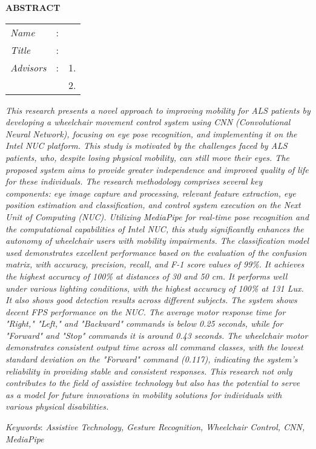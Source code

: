 \begin{center}
  \large\textbf{ABSTRACT}
\end{center}


\vspace{2ex}

\begingroup
\setlength{\tabcolsep}{0pt}

\noindent
\begin{tabularx}{\textwidth}{l >{\centering}m{3em} X}
  \emph{Name}     & : & \name{}         \\

  \emph{Title}    & : & \engtatitle{}   \\

  \emph{Advisors} & : & 1. \advisor{}   \\
                  &   & 2. \coadvisor{} \\
\end{tabularx}
\endgroup

\emph{This research presents a novel approach to improving mobility for ALS patients by developing a wheelchair movement control system using CNN (Convolutional Neural Network), focusing on eye pose recognition, and implementing it on the Intel NUC platform. This study is motivated by the challenges faced by ALS patients, who, despite losing physical mobility, can still move their eyes. The proposed system aims to provide greater independence and improved quality of life for these individuals. The research methodology comprises several key components: eye image capture and processing, relevant feature extraction, eye position estimation and classification, and control system execution on the Next Unit of Computing (NUC). Utilizing MediaPipe for real-time pose recognition and the computational capabilities of Intel NUC, this study significantly enhances the autonomy of wheelchair users with mobility impairments. The classification model used demonstrates excellent performance based on the evaluation of the confusion matrix, with accuracy, precision, recall, and F-1 score values of 99\%. It achieves the highest accuracy of 100\% at distances of 30 and 50 cm. It performs well under various lighting conditions, with the highest accuracy of 100\% at 131 Lux. It also shows good detection results across different subjects. The system shows decent FPS performance on the NUC. The average motor response time for "Right," "Left," and "Backward" commands is below 0.25 seconds, while for "Forward" and "Stop" commands it is around 0.43 seconds. The wheelchair motor demonstrates consistent output time across all command classes, with the lowest standard deviation on the "Forward" command (0.117), indicating the system's reliability in providing stable and consistent responses. This research not only contributes to the field of assistive technology but also has the potential to serve as a model for future innovations in mobility solutions for individuals with various physical disabilities.}

\emph{Keywords}: \emph{Assistive Technology, Gesture Recognition, Wheelchair Control, CNN, MediaPipe}
